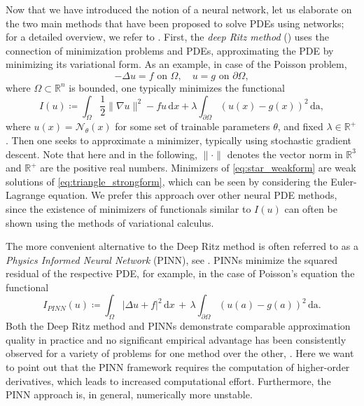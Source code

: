 \documentclass[12pt,openany]{book}
\newcommand{\R}{\mathbb{R}}
\theoremstyle{plainnormal}
\theoremstyle{remark}
\begin{document}
Now that we have introduced the notion of a neural network, let us elaborate on the two main methods that have been proposed to solve PDEs using networks; for a detailed overview, we refer to \cite{E_2021}. First, the \emph{deep Ritz method} (\cite{deepritzmethoddeep}) uses the connection of minimization problems and PDEs, approximating the PDE by minimizing its variational form. As an example, in case of the Poisson problem, \begin{equation}\label{eq:triangle_strongform}
-\Delta u = f \text{ on } \Omega, \quad u = g \text{ on } \partial \Omega,
\tag{$\triangle$}
\end{equation} where $\Omega \subset \R^n $ is bounded, one typically minimizes the functional \begin{equation}\label{eq:star_weakform}
    I(u) \coloneqq \int_\Omega \frac{1}{2} \|\nabla u\|^2 - fu \,\mathrm{d}x + \lambda\int_{\partial \Omega} (u(x)- g(x))^2\, \mathrm{da},\tag{$\star$}
\end{equation}
where $u(x) = \mathcal N_\theta(x)$ for some set of trainable parameters $\theta$, and fixed $\lambda\in \R^+$. Then one seeks to approximate a minimizer, typically using stochastic gradient descent. Note that here and in the following, $\|\cdot\|$ denotes the vector norm in $\R^3$ and $\R^+$ are the positive real numbers. Minimizers of \cref{eq:star_weakform} are weak solutions of \cref{eq:triangle_strongform}, which can be seen by considering the Euler-Lagrange equation. We prefer this approach over other neural PDE methods, since the existence of minimizers of functionals similar to $I(u)$ can often be shown using the methods of variational calculus.\par
The more convenient alternative to the Deep Ritz method is often referred to as a \emph{Physics Informed Neural Network} (PINN), see \cite{RAISSI2019686}. PINNs minimize the squared residual of the respective PDE, for example, in the case of Poisson's equation the functional
$$  I_{PINN}(u) \coloneqq \int_\Omega |\Delta u + f|^2 \,\mathrm{d}x\, +\, \lambda \int_{\partial\Omega}(u(a) - g(a))^2 \, \mathrm{da}  .$$
Both the Deep Ritz method and PINNs demonstrate comparable approximation quality in practice and no significant empirical advantage has been consistently observed for a variety of problems for one method over the other, \cite{yang2025numericalstudyhyperparameter}. 
Here we want to point out that the PINN framework requires the computation of higher-order derivatives, which leads to increased computational effort. Furthermore, the PINN approach is, in general, numerically more unstable.
\end{document}
